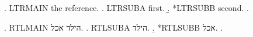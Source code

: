 

\makeatletter
{\@RTLmainfalse
\begin{english}
\ex. LTRMAIN the reference.
\a. LTRSUBA first.
\b. *LTRSUBB second.
\z.
\end{english}}
\makeatother

\ex. RTLMAIN הילד אכל.
\a. RTLSUBA הילד.
\b. *RTLSUBB אכל.
\z.

